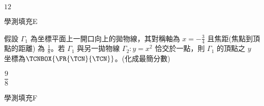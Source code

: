 \begin{QUESTIONS}
\begin{QUESTION}
\begin{QFROMS}
        \end{QFROMS}
        \begin{QTAGS}\end{QTAGS}
        \begin{QANS}
            $12$
        \end{QANS}
        \begin{QSOLLIST}
        \end{QSOLLIST}
        \begin{QEMPTYSPACE}
        \end{QEMPTYSPACE}
    \end{QUESTION}
    \begin{QUESTION}
        \begin{ExamInfo}{98}{學測}{填充}{E}
        \end{ExamInfo}
        \begin{ExamAnsRateInfo}{13}{33}{6}{0}
        \end{ExamAnsRateInfo}
        \begin{QBODY}
            假設 $\Gamma_1$ 為坐標平面上一開口向上的拋物線，其對稱軸為 $x=-\frac{3}{4}$ 且焦距(焦點到頂點的距離) 為 $\frac{1}{8}$。若 $\Gamma_1$ 與另一拋物線 $\Gamma_2 :y=x^2$ 恰交於一點，則 $\Gamma_1$ 的頂點之 $y$ 坐標為$\TCNBOX{\FR{\TCN}{\TCN}}$。(化成最簡分數)
        \end{QBODY}
        \begin{QFROMS}
        \end{QFROMS}
        \begin{QTAGS}\end{QTAGS}
        \begin{QANS}
            $\dfrac{9}{8}$
        \end{QANS}
        \begin{QSOLLIST}
        \end{QSOLLIST}
        \begin{QEMPTYSPACE}
        \end{QEMPTYSPACE}
    \end{QUESTION}
    \begin{QUESTION}
        \begin{ExamInfo}{98}{學測}{填充}{F}
        \end{ExamInfo}
        \begin{ExamAnsRateInfo}{6}{15}{2}{1}
        \end{ExamAnsRateInfo}
        \begin{QBODY}

\end{QBODY}
\end{QUESTION}
\end{QUESTIONS}
